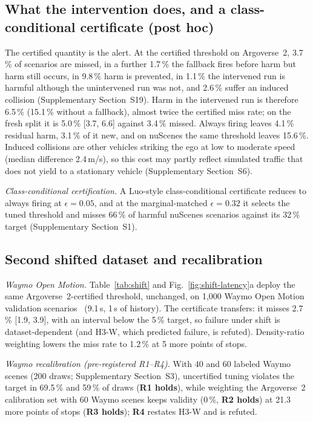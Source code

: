 \documentclass[lettersize,journal]{IEEEtran}
\begin{document}
\subsection{What the intervention does, and a class-conditional certificate (post hoc)}
\label{sec:res-cost}
The certified quantity is the alert. At the certified threshold on
Argoverse~2, 3.7\,\% of scenarios are missed, in a further 1.7\,\% the
fallback fires before harm but harm still occurs, in 9.8\,\% harm is
prevented, in 1.1\,\% the intervened run is harmful although the unintervened
run was not, and 2.6\,\% suffer an induced collision (Supplementary
Section~S19). Harm in the intervened run is therefore 6.5\,\% (15.1\,\% without
a fallback), almost twice the certified miss rate; on the fresh split it is
5.0\,\% [3.7, 6.6] against 3.4\,\% missed. Always firing leaves 4.1\,\% residual
harm, 3.1\,\% of it new, and on nuScenes the same threshold leaves 15.6\,\%.
Induced collisions are other vehicles striking the ego at low to moderate
speed (median difference 2.4\,m/s), so this cost may partly reflect simulated
traffic that does not yield to a stationary vehicle (Supplementary
Section~S6).

\emph{Class-conditional certification.} A Luo-style class-conditional certificate reduces to always firing at $\epsilon=0.05$, and at the marginal-matched $\epsilon=0.32$ it selects the tuned threshold and misses 66\,\% of harmful nuScenes scenarios against its 32\,\% target (Supplementary Section~S1).

\subsection{Second shifted dataset and recalibration}
\label{sec:res-waymo}
\emph{Waymo Open Motion.} Table~\ref{tab:shift} and
Fig.~\ref{fig:shift-latency}a deploy the same
Argoverse~2-certified threshold, unchanged, on 1{,}000 Waymo Open Motion
validation scenarios~\cite{waymo2021} (9.1\,s, 1\,s of history). The
certificate transfers: it misses 2.7\,\% [1.9, 3.9], with an interval below
the 5\,\% target, so failure under shift is dataset-dependent (and H3-W,
which predicted failure, is refuted). Density-ratio weighting lowers the
miss rate to 1.2\,\% at 5 more points of stops.

\emph{Waymo recalibration (pre-registered R1--R4).} With 40 and 60 labeled
Waymo scenes (200 draws; Supplementary Section~S3), uncertified tuning violates
the target in 69.5\,\% and 59\,\% of draws (\textbf{R1 holds}), while weighting
the Argoverse~2 calibration set with 60 Waymo scenes keeps validity (0\,\%,
\textbf{R2 holds}) at 21.3 more points of stops (\textbf{R3 holds});
\textbf{R4} restates H3-W and is refuted.
\end{document}
